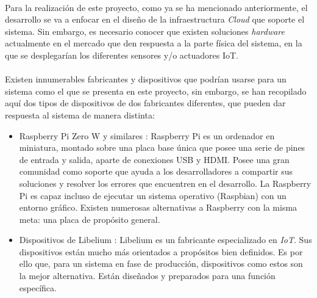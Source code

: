 \documentclass[../../memoria.tex]{subfiles}
\begin{document}
\paragraph{}
Para la realización de este proyecto, como ya se ha mencionado anteriormente, el desarrollo se va a enfocar en el diseño de la infraestructura \textit{Cloud} que soporte el sistema. Sin embargo, es necesario conocer que existen soluciones \textit{hardware} actualmente en el mercado que den respuesta a la parte física del sistema, en la que se desplegarían los diferentes sensores y/o actuadores IoT.

\paragraph{}
Existen innumerables fabricantes y dispositivos que podrían usarse para un sistema como el que se presenta en este proyecto, sin embargo, se han recopilado aquí dos tipos de dispositivos de dos fabricantes diferentes, que pueden dar respuesta al sistema de manera distinta:

\begin{itemize}

    \item Raspberry Pi Zero W y similares \cite{raspberry}: Raspberry Pi es un ordenador en miniatura, montado sobre una placa base única que posee una serie de pines de entrada y salida, aparte de conexiones USB y HDMI. Posee una gran comunidad como soporte que ayuda a los desarrolladores a compartir sus soluciones y resolver los errores que encuentren en el desarrollo. La Raspberry Pi es capaz incluso de ejecutar un sistema operativo (Raspbian) con un entorno gráfico. Existen numerosas alternativas a Raspberry con la misma meta: una placa de propósito general.

    \item Dispositivos de Libelium \cite{libelium}: Libelium es un fabricante especializado en \textit{IoT}. Sus dispositivos están mucho más orientados a propósitos bien definidos. Es por ello que, para un sistema en fase de producción, dispositivos como estos son la mejor alternativa. Están diseñados y preparados para una función específica.
\end{itemize}
\end{document}

